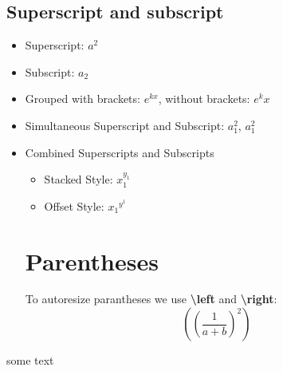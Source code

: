 \documentclass{article}
\begin{document}
\subsection{Superscript and subscript}
\begin{itemize}
\item Superscript: \(a ^ 2\)
\item Subscript: \(a_2\)
\item Grouped with brackets: \(e^{kx}\), without brackets: \(e^kx\)
\item Simultaneous Superscript and Subscript: \(a_1^2\), \(a^2_1\)
\item Combined Superscripts and Subscripts
\begin{itemize}
    \item Stacked Style: \(x_1^{y_1}\) 
    \item Offset Style: \({x_1}^{y^1}\)
\end{itemize}

\section{Parentheses}\label{sec:parentheses}
To autoresize parantheses we use \textbf{\textbackslash left} and \textbf{\textbackslash right}:
\[\left( \left( \frac{1}{a + b} \right)^2 \right)\]
    
\end{itemize}
some text
\end{document}
